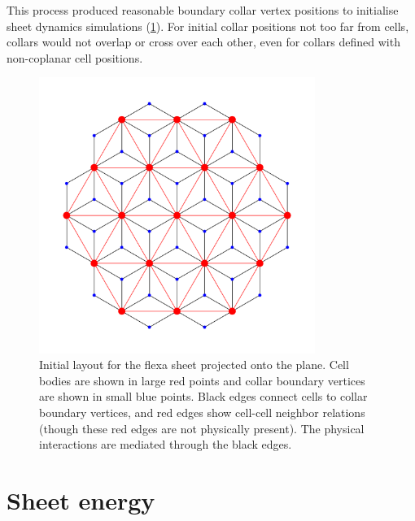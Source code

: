 This process produced reasonable boundary collar vertex positions to initialise sheet dynamics simulations (\cref{fig:layout_init}). 
For initial collar positions not too far from cells, collars would not overlap or cross over each other, even for collars defined with non-coplanar cell positions. 


\begin{figure}[hbtp]
    \centering
    \includegraphics[width=0.8\textwidth]{layout_init.png}
    \caption[Initial layout of the hexagonal lattice flexa sheet]{Initial layout for the flexa sheet projected onto the plane. Cell bodies are shown in large red points and collar boundary vertices are shown in small blue points. Black edges connect cells to collar boundary vertices, and red edges show cell-cell neighbor relations (though these red edges are not physically present). The physical interactions are mediated through the black edges.}
    \label{fig:layout_init}
\end{figure}

\section{Sheet energy} \label{sec:sheet_energy}

